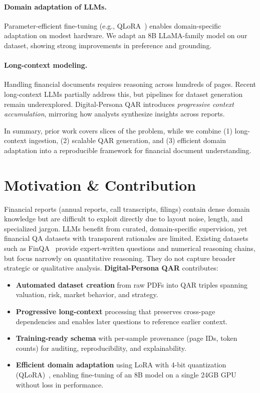 \documentclass[sigconf,authordraft,anonymous]{acmart}
\begin{document}
\paragraph{Domain adaptation of LLMs.}
Parameter-efficient fine-tuning (e.g., QLoRA~\cite{dettmers2023qloraefficientfinetuningquantized}) enables domain-specific adaptation on modest hardware. We adapt an 8B LLaMA-family model on our dataset, showing strong improvements in preference and grounding.

\paragraph{Long-context modeling.}
Handling financial documents requires reasoning across hundreds of pages. Recent long-context LLMs partially address this, but pipelines for dataset generation remain underexplored. Digital-Persona QAR introduces \emph{progressive context accumulation}, mirroring how analysts synthesize insights across reports.

In summary, prior work covers slices of the problem, while we combine (1) long-context ingestion, (2) scalable QAR generation, and (3) efficient domain adaptation into a reproducible framework for financial document understanding.

\section{Motivation \& Contribution}
Financial reports (annual reports, call transcripts, filings) contain dense domain knowledge but are difficult to exploit directly due to layout noise, length, and specialized jargon. LLMs benefit from curated, domain-specific supervision, yet financial QA datasets with transparent rationales are limited. Existing datasets such as FinQA~\cite{chen2022finqadatasetnumericalreasoning} provide expert-written questions and numerical reasoning chains, but focus narrowly on quantitative reasoning. They do not capture broader strategic or qualitative analysis. \textbf{Digital-Persona QAR} contributes:
\begin{itemize}
  \item \textbf{Automated dataset creation} from raw PDFs into QAR triples spanning valuation, risk, market behavior, and strategy.
  \item \textbf{Progressive long-context} processing that preserves cross-page dependencies and enables later questions to reference earlier context.
  \item \textbf{Training-ready schema} with per-sample provenance (page IDs, token counts) for auditing, reproducibility, and explainability.
  \item \textbf{Efficient domain adaptation} using LoRA with 4-bit quantization (QLoRA)~\cite{dettmers2023qloraefficientfinetuningquantized}, enabling fine-tuning of an 8B model on a single 24GB GPU without loss in performance.
\end{itemize}
\end{document}
